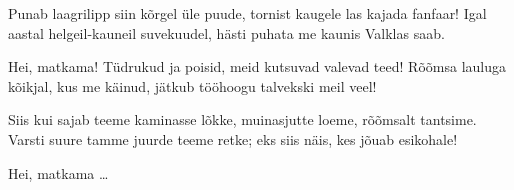 Punab laagrilipp siin k\~orgel \"ule puude,
tornist kaugele las kajada fanfaar!
Igal aastal helgeil-kauneil suvekuudel,
h\"asti puhata me kaunis Valklas saab.

Hei, matkama! T\"udrukud ja poisid,
meid kutsuvad valevad teed!
R\~o\~omsa lauluga k\~oikjal, kus me k\"ainud,
j\"atkub t\"o\"ohoogu talvekski meil veel!

Siis kui sajab teeme kaminasse l\~okke,
muinasjutte loeme, r\~o\~omsalt tantsime.
Varsti suure tamme juurde teeme retke;
eks siis n\"ais, kes j\~ouab esikohale!

Hei, matkama \ldots